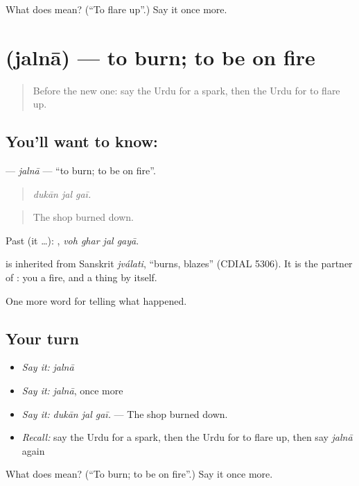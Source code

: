 \begin{tcolorbox}[breakable,colback=teal!4,colframe=teal!35!black,title={Before you move on}]
What does  mean? (\textquotedblleft{}To flare up\textquotedblright{}.) Say it once more.
\end{tcolorbox}
\section[\texorpdfstring{\ur{جلنا} (jalnā)}{جلنا (jalnā)}]{ (jalnā) — to burn; to be on fire}

\label{lesson:UR-C287-jalna}



\begin{quote}
Before the new one: say the Urdu for a spark, then the Urdu for to flare up.
\end{quote}

\subsection*{You'll want to know: }
\textbf{} — \emph{jalnā} — \textquotedblleft{}to burn; to be on fire\textquotedblright{}.

\begin{quote}
  
\end{quote}

\begin{quote}
\emph{dukān jal gaī.}
\end{quote}

\begin{quote}
The shop burned down.
\end{quote}

Past (it …):    , \emph{voh ghar jal gayā}.

\begin{cousinweb}
is inherited from Sanskrit \emph{jválati}, \textquotedblleft{}burns, blazes\textquotedblright{} (CDIAL 5306). It is the partner of \textbf{}: you \textbf{} a fire, and a thing \textbf{} by itself.
\end{cousinweb}

\begin{grammarlens}[title={What you've built}]
One more word for telling what happened.
\end{grammarlens}

\subsection*{Your turn}
\begin{itemize}
\raggedright
  \item \emph{Say it:} \emph{jalnā}
  \item \emph{Say it:} \emph{jalnā}, once more
  \item \emph{Say it:} \emph{dukān jal gaī.} — The shop burned down.
  \item \emph{Recall:} say the Urdu for a spark, then the Urdu for to flare up, then say \emph{jalnā} again
\end{itemize}

\begin{tcolorbox}[breakable,colback=teal!4,colframe=teal!35!black,title={Before you move on}]
What does  mean? (\textquotedblleft{}To burn; to be on fire\textquotedblright{}.) Say it once more.
\end{tcolorbox}

